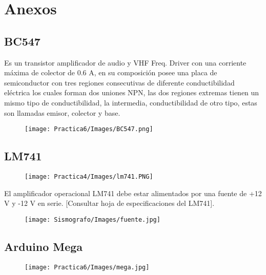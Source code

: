 \documentclass[12pt]{article}
\begin{document}

    \section{Anexos}
    \subsection{BC547}
    
    Es un transistor amplificador de audio y VHF Freq. Driver con una corriente máxima de colector de 0.6 A, en su composición posee una placa de semiconductor con tres regiones consecutivas de diferente conductibilidad eléctrica los cuales forman dos uniones NPN, las dos regiones extremas tienen un mismo tipo de conductibilidad, la intermedia, conductibilidad de otro tipo, estas son llamadas emisor, colector y base.
    
    \begin{figure}[h!]
                \centering
                \texttt{[image: Practica6/Images/BC547.png]}
            \end{figure} 
    \newpage
    \subsection{LM741}
	        \begin{figure}[h!]
                \centering
                \texttt{[image: Practica4/Images/lm741.PNG]}
            \end{figure} 
	        El amplificador operacional LM741 debe estar alimentados por una fuente de +12 V y -12 V en serie. [Consultar hoja de especificaciones del LM741].
	        
	        \begin{figure}[h!]
                \centering
                \texttt{[image: Sismografo/Images/fuente.jpg]}
            \end{figure} 
        \newpage
    \subsection{Arduino Mega}
        \begin{figure}[h!]
                \centering
                \texttt{[image: Practica6/Images/mega.jpg]}
            \end{figure} 
    
\end{document}
